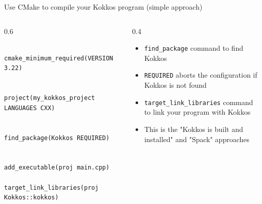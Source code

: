 \documentclass[
    aspectratio=169,
    \createHandout
]{beamer}
\begin{document}

\begin{frame}[fragile]{Use CMake to compile your Kokkos program (simple approach)}
    \begin{columns}
        \begin{column}{0.6\linewidth}
            \begin{verbatim}
                cmake_minimum_required(VERSION 3.22)

                project(my_kokkos_project LANGUAGES CXX)

                find_package(Kokkos REQUIRED)

                add_executable(proj main.cpp)
                target_link_libraries(proj Kokkos::kokkos)
            \end{verbatim}
        \end{column}
        \begin{column}{0.4\linewidth}
            \begin{itemize}
                \item \texttt{find\_package} command to find Kokkos
                \item \texttt{REQUIRED} aborts the configuration if Kokkos is not found
                \item \texttt{target\_link\_libraries} command to link your program with Kokkos
                \item This is the "Kokkos is built and installed" and "Spack" approaches
            \end{itemize}
        \end{column}
    \end{columns}
\end{frame}

\end{document}
